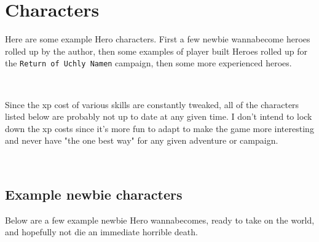 

%
%


\cleardoublepage
\raggedbottom


\chapter*{Characters}
\label{cpt:characters}

Here are some example Hero characters. First a few newbie wannabecome heroes rolled up by the author, then some examples of player built Heroes rolled up for the \texttt{Return of Uchly Namen} campaign, then some more experienced heroes.

\

Since the xp cost of various skills are constantly tweaked, all of the characters listed below are probably not up to date at any given time. I don't intend to lock down the xp costs since it's more fun to adapt to make the game more interesting and never have "the one best way" for any given adventure or campaign.

\

\goodbreak
{} {}
\section*{Example newbie characters}
Below are a few example newbie Hero wannabecomes, ready to take on the world, and hopefully not die an immediate horrible death.

%
%






